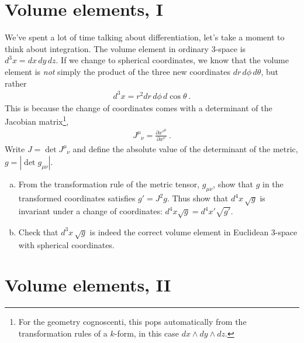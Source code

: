 \documentclass[12pt]{article}
\numberwithin{equation}{section}    %
\begin{document}
\section{Volume elements, I}


We've spent a lot of time talking about differentiation, let's take a moment to think about integration. The volume element in ordinary 3-space is $d^3x = dx\, dy\, dz$. If we change to spherical coordinates, we know that the volume element is \emph{not} simply the product of the three new coordinates $dr \, d\phi\, d\theta$, but rather
\begin{align}
	d^3x = r^2 dr \, d\phi \, d\cos\theta   \ .
\end{align}
This is because the change of coordinates comes with a determinant of the Jacobian matrix\footnote{For the geometry cognoscenti, this pops automatically from the transformation rules of a $k$-form, in this case $dx\wedge dy\wedge dz$.},
\begin{align}
	J^\mu_{\phantom{\mu}\nu} =  \frac{\partial x'^\mu}{\partial x^\nu} \ .
\end{align}
Write $J = \det J^\mu_{\phantom{\mu}\nu}$ and define the absolute value of the determinant of the metric, $g=|\det g_{\mu\nu}|$.
\begin{enumerate}[(a)]
	\item From the transformation rule of the metric tensor, $g_{\mu\nu}$, show that $g$ in the transformed coordinates satisfies $g' = J^2 g$. Thus show that $d^4x\, \sqrt{g}$ is invariant under a change of coordinates: $d^4x \sqrt{g} = d^4x'\sqrt{g'}$.  
	\item Check that $d^3x \, \sqrt{g}$ is indeed the correct volume element in Euclidean 3-space with spherical coordinates.
\end{enumerate}

\section{Volume elements, II}
\end{document}
